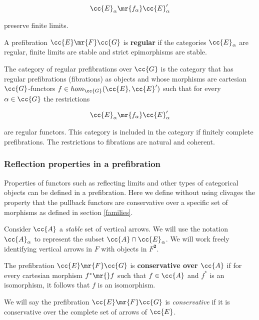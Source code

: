 \begin{align*}
\cc{E}_\alpha \mr{f_\alpha} \cc{E}'_\alpha
\end{align*}

\noindent preserve finite limits. 

\begin{definition}
A prefibration ${\cc{E} \mr{F} \cc{G}}$ is  \textbf{regular} if the categories $\cc{E}_\alpha$ are regular, finite limits are stable and strict epimorphisms are stable.
\end{definition}

The category of regular prefibrations  over $\cc{G}$ is the category that has regular prefibrations (fibrations) as objects and whose morphisms are cartesian $\cc{G}$-functors $f \in hom_{\cc{G}}(\cc{E},\cc{E}')$ such that for every $\alpha \in \cc{G}$ the restrictions 

\begin{align*}
\cc{E}_\alpha \mr{f_\alpha} \cc{E}'_\alpha
\end{align*}

\noindent are regular functors. This category is included in the category if finitely complete prefibrations. The restrictions to fibrations are natural and coherent.

\subsubsection{Reflection properties in a prefibration}
Properties of functors such as reflecting limits and other types of categorical objects can be defined in a prefibration. Here we define without using clivages the property that the pullback functors are conservative over a specific set of morphisms as defined in section \ref{families}.  

Consider $\cc{A}$ a \textit{stable} set of vertical arrows. We will use the notation  $\cc{A}_\alpha$ to represent the subset $\cc{A} \cap \cc{E}_\alpha$. We will work freely identifying vertical arrows in $F$ with objects in $F^{\textbf{2}}$.

\begin{definition}
The prefibration ${\cc{E} \mr{F} \cc{G}}$ is \textbf{conservative over $\cc{A}$} if for every cartesian morphism $f^* \mr{} f$ such that $f \in \cc{A}$ and $f^*$ is an isomorphism, it follows that $f$ is an isomorphism.
\end{definition}

\noindent We will say the prefibration ${\cc{E} \mr{F} \cc{G}}$ is \textit{conservative} if it is conservative over the complete set of arrows of $\cc{E}$. 


